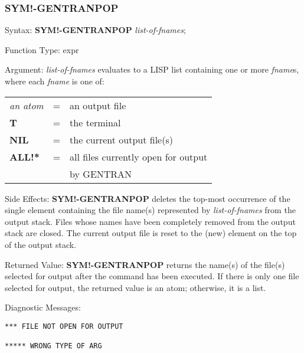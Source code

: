 \subsubsection{SYM!-GENTRANPOP} 
\begin{describe}{Syntax:}
{\bf SYM!-GENTRANPOP} {\it list-of-fnames\/};
\end{describe}
\begin{describe}{Function Type:}
expr
\end{describe}
\begin{describe}{Argument:}
{\it list-of-fnames\/} evaluates to a LISP list containing one or more
{\it fname\/}s, where each {\it fname\/} is one of:

\begin{tabular}{lll}
{\it an atom} & = &  an output file\\
{\bf T} & = & the terminal\\
{\bf NIL} & = & the current output file(s)\\
{\bf ALL!*} & = & all files currently open for output \\
& & by GENTRAN\\
\end{tabular}
\end{describe}
\begin{describe}{Side Effects:}
{\bf SYM!-GENTRANPOP} deletes the top-most occurrence of the
single element containing the file name(s) represented by
{\it list-of-fnames\/} from the output stack.  Files whose names have been
completely removed from the output stack are closed.  The current output file
is reset to the (new) element on the top of the output stack.
\end{describe}
\begin{describe}{Returned Value:}
{\bf SYM!-GENTRANPOP} returns the name(s) of the file(s)
selected for output after the command has been executed.  If there is
only one file selected for output, the returned value is an atom; otherwise,
it is a list.
\end{describe}
\begin{describe}{Diagnostic Messages:}
\begin{verbatim}
*** FILE NOT OPEN FOR OUTPUT

***** WRONG TYPE OF ARG

\end{verbatim}
\end{describe}

